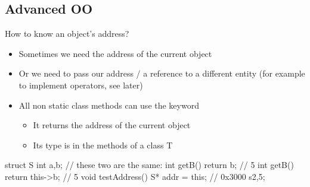 \subsection[advOO]{Advanced OO}

\begin{frame}[fragile]
  \begin{block}{How to know an object's address?}
    \begin{itemize}
    \item Sometimes we need the address of the current object
    \item Or we need to pass our address / a reference to a different entity
      (for example to implement operators, see later)
    \item All non static class methods can use the keyword 
      \begin{itemize}
        \item It returns the address of the current object
        \item Its type is  in the methods of a class {\ttfamily T}
      \end{itemize}
    \end{itemize}
  \end{block}
  \begin{minipage}{0.7\textwidth}
  \begin{cppcode}
    struct S {
      int a,b;
      // these two are the same:
      int getB() { return b; }       // 5
      int getB() { return this->b; } // 5
      void testAddress() {
        S* addr = this; // 0x3000
      }
    } s{2,5};
  \end{cppcode}
  \end{minipage}%
  \hfil%
  \begin{minipage}{0.3\textwidth}
    \end{minipage}
\end{frame}

